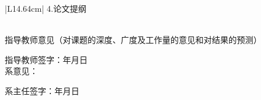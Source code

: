 \documentclass[a4paper,zihao=-4]{ctexart}
\begin{document}
{\songti
\begin{center}
\begin{tabular}{|L{14.64cm}|}
\hline
4.论文提纲\par
\vspace{5.0cm} \\
\hline
指导教师意见（对课题的深度、广度及工作量的意见和对结果的预测）\par
\vspace{5.0cm}
\hfill 指导教师签字：\hspace{3.5cm}年\hspace{0.7cm}月\hspace{0.7cm}日 \\
\hline
系意见：\par
\vspace{4.4cm}
\hfill 系主任签字：\hspace{3.5cm}年\hspace{0.7cm}月\hspace{0.7cm}日 \\
\hline
\end{tabular}
\end{center}
}
\end{document}
